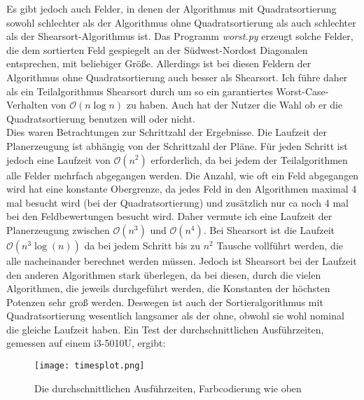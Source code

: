 \documentclass[12pt]{article}
\newcommand{\bigo}{\mathcal{O}}
\begin{document}
Es gibt jedoch auch Felder, in denen der Algorithmus mit Quadratsortierung sowohl schlechter als der Algorithmus ohne Quadratsortierung als auch schlechter als der Shearsort-Algorithmus ist. Das Programm \textit{worst.py} erzeugt solche Felder, die dem sortierten Feld gespiegelt an der Südwest-Nordost Diagonalen entsprechen, mit beliebiger Größe. Allerdings ist bei diesen Feldern der Algorithmus ohne Quadratsortierung auch besser als Shearsort. Ich führe daher als ein Teilalgorithmus Shearsort durch um so ein garantiertes Worst-Case-Verhalten von $\bigo(n\log n)$ zu haben. Auch hat der Nutzer die Wahl ob er die Quadratsortierung benutzen will oder nicht. \\

Dies waren Betrachtungen zur Schrittzahl der Ergebnisse. Die Laufzeit der Planerzeugung ist abhängig von der Schrittzahl der Pläne. Für jeden Schritt ist jedoch eine Laufzeit von $\bigo(n^2)$ erforderlich, da bei jedem der Teilalgorithmen alle Felder mehrfach abgegangen werden. Die Anzahl, wie oft ein Feld abgegangen wird hat eine konstante Obergrenze, da jedes Feld in den Algorithmen maximal 4 mal besucht wird (bei der Quadratsortierung) und zusätzlich nur ca noch 4 mal bei den Feldbewertungen besucht wird. Daher vermute ich eine Laufzeit der Planerzeugung zwischen $\bigo(n^3)$ und $\bigo(n^4)$. Bei Shearsort ist die Laufzeit $\bigo(n^3\log(n))$ da bei jedem Schritt bis zu $n^2$ Tausche vollführt werden, die alle nacheinander berechnet werden müssen. Jedoch ist Shearsort bei der Laufzeit den anderen Algorithmen stark überlegen, da bei diesen, durch die vielen Algorithmen, die jeweils durchgeführt werden, die Konstanten der höchsten Potenzen sehr groß werden. Deswegen ist auch der Sortieralgorithmus mit Quadratsortierung wesentlich langsamer als der ohne, obwohl sie wohl nominal die gleiche Laufzeit haben. Ein Test der durchschnittlichen Ausführzeiten, gemessen auf einem i3-5010U, ergibt:\\
\begin{figure}[h]
 \centering
 \texttt{[image: timesplot.png]}
 \caption{Die durchschnittlichen Ausführzeiten, Farbcodierung wie oben}
\end{figure}
\end{document}
